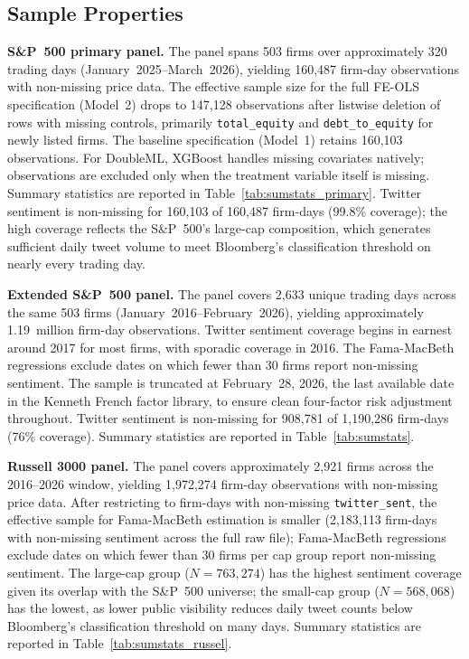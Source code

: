 \subsection{Sample Properties}\label{sample-properties}

\textbf{S\&P~500 primary panel.} The panel spans 503 firms over
approximately 320 trading days (January~2025--March~2026), yielding
160,487 firm-day observations with non-missing price data. The effective
sample size for the full FE-OLS specification (Model~2) drops to 147,128
observations after listwise deletion of rows with missing controls,
primarily \texttt{total\_equity} and \texttt{debt\_to\_equity} for newly
listed firms. The baseline specification (Model~1) retains 160,103
observations. For DoubleML, XGBoost handles missing covariates natively;
observations are excluded only when the treatment variable itself is
missing. Summary statistics are reported in
Table~\ref{tab:sumstats_primary}. Twitter sentiment is non-missing for
160,103 of 160,487 firm-days (99.8\% coverage); the high coverage
reflects the S\&P~500's large-cap composition, which generates sufficient
daily tweet volume to meet Bloomberg's classification threshold on nearly
every trading day.

\textbf{Extended S\&P~500 panel.} The panel covers 2,633 unique trading
days across the same 503 firms (January~2016--February~2026), yielding
approximately 1.19~million firm-day observations. Twitter sentiment
coverage begins in earnest around 2017 for most firms, with sporadic
coverage in 2016. The Fama-MacBeth regressions exclude dates on which
fewer than 30 firms report non-missing sentiment. The sample is truncated
at February~28, 2026, the last available date in the Kenneth French
factor library, to ensure clean four-factor risk adjustment throughout.
Twitter sentiment is non-missing for 908,781 of 1,190,286 firm-days
(76\% coverage). Summary statistics are reported in
Table~\ref{tab:sumstats}.

\textbf{Russell 3000 panel.} The panel covers approximately 2,921 firms
across the 2016--2026 window, yielding 1,972,274 firm-day observations
with non-missing price data. After restricting to firm-days with
non-missing \texttt{twitter\_sent}, the effective sample for Fama-MacBeth
estimation is smaller (2,183,113 firm-days with non-missing sentiment
across the full raw file); Fama-MacBeth regressions exclude dates on
which fewer than 30 firms per cap group report non-missing sentiment. The
large-cap group (\(N = 763,274\)) has the highest sentiment coverage
given its overlap with the S\&P~500 universe; the small-cap group
(\(N = 568,068\)) has the lowest, as lower public visibility reduces
daily tweet counts below Bloomberg's classification threshold on many
days. Summary statistics are reported in Table~\ref{tab:sumstats_russel}.
